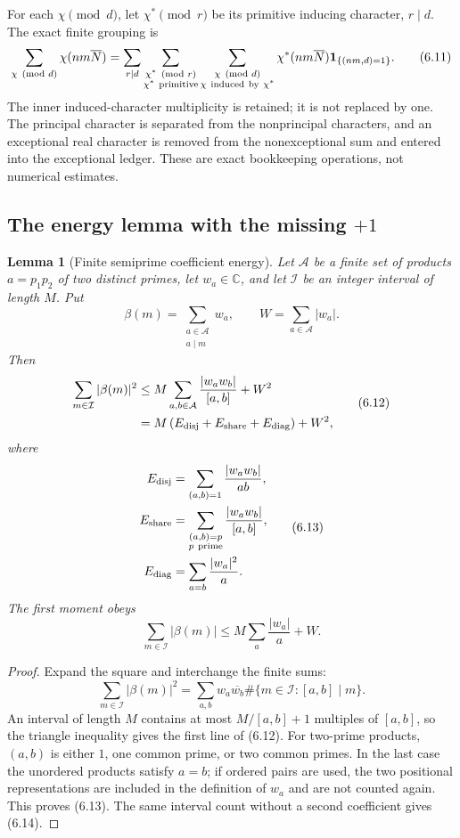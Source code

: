 \documentclass[11pt]{article}
\newtheorem{lemma}[theorem]{Lemma}
\theoremstyle{definition}
\begin{document}
For each \(\chi\pmod d\), let \(\chi^*\pmod r\) be its primitive inducing
character, \(r\mid d\).  The exact finite grouping is
\[
 \sum_{\chi\pmod d} \chi(nm\overline N)
 =
 \sum_{r\mid d}
 \sum_{\substack{\chi^*\pmod r\\\chi^*\ {\rm primitive}}}
 \sum_{\substack{\chi\pmod d\\\chi\ {\rm induced\ by\ }\chi^*}}
 \chi^*(nm\overline N)
 \mathbf1_{\{(nm,d)=1\}}.
\tag{6.11}
\]
The inner induced-character multiplicity is retained; it is not replaced by
one.  The principal character is separated from the nonprincipal characters,
and an exceptional real character is removed from the nonexceptional sum
and entered into the exceptional ledger.  These are exact bookkeeping
operations, not numerical estimates.

\subsection{The energy lemma with the missing \(+1\)}
\label{sec:energy}

\begin{lemma}[Finite semiprime coefficient energy]
\label{lem:energy}
Let \(\mathcal A\) be a finite set of products \(a=p_1p_2\) of two
distinct primes, let \(w_a\in\mathbb C\), and let \(\mathcal I\) be an
integer interval of length \(M\).  Put
\[
 \beta(m)=\sum_{\substack{a\in\mathcal A\\a\mid m}}w_a,\qquad
 W=\sum_{a\in\mathcal A}|w_a|.
\]
Then
\[
\begin{aligned}
 \sum_{m\in\mathcal I}|\beta(m)|^2
 &\le
 M\sum_{a,b\in\mathcal A}\frac{|w_aw_b|}{[a,b]}+W^2\\
 &=M\left(E_{\rm disj}+E_{\rm share}+E_{\rm diag}\right)+W^2,
\end{aligned}
\tag{6.12}
\]
where
\[
\begin{aligned}
 E_{\rm disj}&=\sum_{(a,b)=1}\frac{|w_aw_b|}{ab},\\
 E_{\rm share}&=\sum_{\substack{(a,b)=p\\p\ {\rm prime}}}
 \frac{|w_aw_b|}{[a,b]},\\
 E_{\rm diag}&=\sum_{a=b}\frac{|w_a|^2}{a}.
\end{aligned}
\tag{6.13}
\]
The first moment obeys
\[
 \sum_{m\in\mathcal I}|\beta(m)|
 \le M\sum_a\frac{|w_a|}{a}+W.
\tag{6.14}
\]
\end{lemma}

\begin{proof}
Expand the square and interchange the finite sums:
\[
 \sum_{m\in\mathcal I}|\beta(m)|^2
 =\sum_{a,b}w_a\overline{w_b}
 \#\{m\in\mathcal I:[a,b]\mid m\}.
\]
An interval of length \(M\) contains at most \(M/[a,b]+1\) multiples
of \([a,b]\), so the triangle inequality gives the first line of (6.12).
For two-prime products, \((a,b)\) is either \(1\), one common prime, or
two common primes.  In the last case the unordered products satisfy
\(a=b\); if ordered pairs are used, the two positional representations
are included in the definition of \(w_a\) and are not counted again.
This proves (6.13).  The same interval count without a second coefficient
gives (6.14).
\end{proof}
\end{document}
